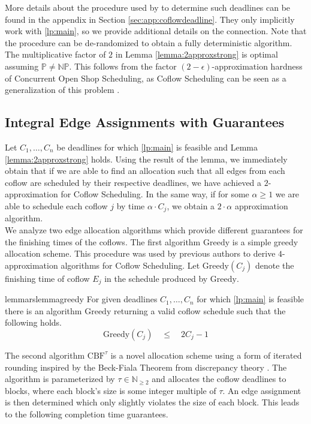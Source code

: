 \documentclass[11pt]{article}
\begin{document}
More details about the procedure used by \cite{im19} to determine such deadlines can be found in the appendix in Section \ref{sec:app:coflowdeadline}. They only implicitly work with \ref{lp:main}, so we provide additional details on the connection. Note that the procedure can be de-randomized to obtain a fully deterministic algorithm.\\

The multiplicative factor of $2$ in Lemma \ref{lemma:2approxstrong} is optimal assuming $\mathbb{P} \neq \mathbb{NP}$. This follows from the factor $(2-\epsilon)$-approximation hardness of Concurrent Open Shop Scheduling, as Coflow Scheduling can be seen as a generalization of this problem \cite{Sachdeva2013}.

\subsection{Integral Edge Assignments with Guarantees}
Let $C_1,\dotsc,C_n$ be deadlines for which \ref{lp:main} is feasible and Lemma \ref{lemma:2approxstrong} holds. Using the result of the lemma, we immediately obtain that if we are able to find an allocation such that all edges from each coflow are scheduled by their respective deadlines, we have achieved a $2$-approximation for Coflow Scheduling. In the same way, if for some $\alpha \ge 1$ we are able to schedule each coflow $j$ by time $\alpha \cdot C_j$, we obtain a $2 \cdot \alpha$ approximation algorithm.\\

We analyze two edge allocation algorithms which provide different guarantees for the finishing times of the coflows. The first algorithm $\mathrm{Greedy}$ is a simple greedy allocation scheme. This procedure was used by previous authors to derive $4$-approximation algorithms for Coflow Scheduling. Let $\mathrm{Greedy}(C_j)$ denote the finishing time of coflow $E_j$ in the schedule produced by $\mathrm{Greedy}$.
\begin{restatable}{lemma}{rslemmagreedy}\label{lemma:greedy}
For given deadlines $C_1,\dotsc,C_n$ for which \ref{lp:main} is feasible there is an algorithm $\mathrm{Greedy}$ returning a valid coflow schedule such that the following holds.
\begin{equation*}
\mathrm{Greedy}(C_j) \quad \le \quad 2C_j-1
\end{equation*}
\end{restatable}

The second algorithm $\mathrm{CBF}^\tau$ is a novel allocation scheme using a form of iterated rounding inspired by the Beck-Fiala Theorem from discrepancy theory \cite{Beck1981}. The algorithm is parameterized by $\tau \in \mathbb{N}_{\ge 2}$ and allocates the coflow deadlines to blocks, where each block's size is some integer multiple of $\tau$. An edge assignment is then determined which only slightly violates the size of each block. This leads to the following completion time guarantees.
\end{document}
